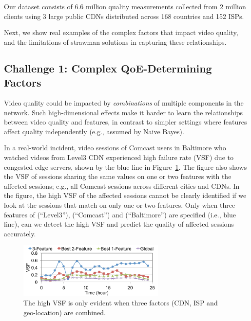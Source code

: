 Our dataset consists of 6.6 million quality 
measurements collected from 2 million clients 
using 3 large public CDNs distributed across 
168 countries and 152 ISPs.

Next, we show real examples of the complex factors 
that impact video quality, and the limitations of strawman
solutions in capturing these relationships.

\subsection{Challenge 1: Complex QoE-Determining Factors}
\label{subsec:expressive}

Video quality could be impacted by {\em combinations} 
of multiple components in the network. 
Such high-dimensional effects make 
it harder to learn the relationships between video 
quality  and features, in contrast to simpler settings 
where features affect quality independently 
(e.g., assumed by Naive Bayes).




In a real-world incident,
video sessions of Comcast users in Baltimore who watched 
videos from Level3 CDN experienced high failure rate (VSF) 
due to congested edge servers, shown by the blue line in 
Figure~\ref{fig:timeseries-expressive-model}.
The figure also shows the VSF of sessions sharing the same
values on one or two features with the affected sessions; 
e.g., all Comcast sessions across different cities and CDNs. 
In the figure, the high VSF of the affected sessions cannot be 
clearly identified if we look at the sessions 
 that match on only one or two features.
Only when three features of \fCDN (``Level3''), 
\fASN (``Comcast'') and \fCity (``Baltimore'') 
are specified (i.e., blue line), can we detect the 
high VSF and predict the quality of 
affected sessions accurately. 

\begin{figure}[t!]
\centering
\includegraphics[width=0.65\textwidth]{figures/cfa-example-highdimension-timeseries.pdf}
\caption{The high VSF is only evident when three factors 
(CDN, ISP and geo-location) are combined.}
\label{fig:timeseries-expressive-model}
\end{figure}

